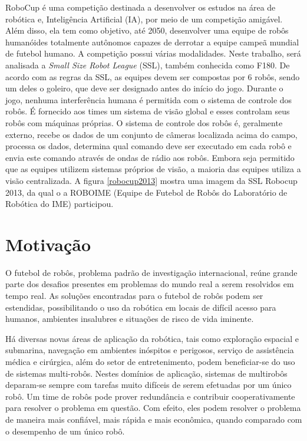 RoboCup é uma competição destinada a desenvolver os estudos na área de robótica e,
Inteligência Artificial (IA), por meio de um competição amigável. Além disso, ela tem
como objetivo, até 2050, desenvolver uma equipe de robôs humanóides totalmente
autônomos capazes de derrotar a equipe campeã mundial de futebol humano. A competição
possui várias modalidades. Neste trabalho, será analisada a \textit{Small Size Robot League} (SSL),
também conhecida como F180. De acordo com as regras da SSL, as equipes devem ser
compostas por 6 robôs, sendo um deles o goleiro, que deve ser
designado antes do início do jogo. Durante o jogo, nenhuma interferência humana é
permitida com o sistema de controle dos robôs. É fornecido aos times um sistema de
visão global e esses controlam seus robôs com máquinas próprias. O sistema de controle
dos robôs é, geralmente externo, recebe os dados de um conjunto de câmeras
localizada acima do campo, processa os dados, determina qual comando deve ser executado
em cada robô e envia este comando através de ondas de rádio aos robôs. Embora seja
permitido que as equipes utilizem sistemas próprios de visão, a maioria das
equipes utiliza a visão centralizada. A figura \ref{robocup2013} mostra uma
imagem da SSL Robocup 2013, da qual o a ROBOIME (Equipe de Futebol de Robôs do
Laboratório de Robótica do IME) participou.

\section{Motivação}

O futebol de robôs, problema padrão de investigação internacional, reúne grande parte
dos desafios presentes em problemas do mundo real a serem resolvidos em tempo real.
As soluções encontradas para o futebol de robôs podem ser estendidas, possibilitando
o uso da robótica em locais de difícil acesso para humanos, ambientes insalubres e
situações de risco de vida iminente.

Há diversas novas áreas de aplicação da robótica, tais como exploração espacial e submarina,
navegação em ambientes inóspitos e perigosos, serviço de assistência médica
e cirúrgica, além do setor de entretenimento, podem beneficiar-se do uso de sistemas
multi-robôs. Nestes domínios de aplicação, sistemas de multirobôs deparam-se sempre
com tarefas muito difíceis de serem efetuadas por um único robô. Um time de robôs pode
prover redundância e contribuir cooperativamente para resolver o problema em questão.
Com efeito, eles podem resolver o problema de maneira mais confiável, mais rápida e
mais econômica, quando comparado com o desempenho de um único robô.

